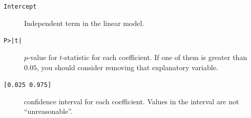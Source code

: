 \documentclass[10pt,landscape]{article}
\makeatletter
\renewcommand{\section}{\@startsection{section}{1}{0mm}%
                                {-1ex plus -.5ex minus -.2ex}%
                                {0.5ex plus .2ex}%
                                {\normalfont\large\bfseries}}
\renewcommand{\subsection}{\@startsection{subsection}{2}{0mm}%
                                {-1explus -.5ex minus -.2ex}%
                                {0.5ex plus .2ex}%
                                {\normalfont\normalsize\bfseries}}
\makeatother
\begin{document}
\begin{multicols*}{3}
\begin{description}
  \item[\texttt{Intercept}] Independent term in the linear model.
  \item[\texttt{P>|t|}] $p$-value for $t$-statistic for each coefficient. If one of them is greater than $0.05$, you should consider removing that explanatory variable.
  \item[\texttt{[0.025   0.975]}] confidence interval for each coefficient. Values in the interval are not ``unreasonable''.
\end{description}




\end{multicols*}
\end{document}
